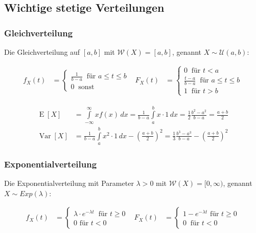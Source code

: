 \documentclass[25pt]{sciposter}
\newcommand{\W}{\mathcal{W}}
\newcommand{\U}{\mathcal{U}}
\newcommand{\Var}{\operatorname{Var}}
\newcommand{\E}{\operatorname{E}}
\begin{document}
\begin{multicols}{3}
\subsection*{Wichtige stetige Verteilungen}

\subsubsection*{Gleichverteilung}
Die Gleichverteilung auf $[a,b]$ mit $\W(X)=[a,b]$, genannt $X\sim\U(a,b)$:

\begin{align*}
	f_X(t) &= \begin{cases}
	\frac{1}{b-a} \ \text{ für } a \leq t \leq b\\
	0 \ \text{ sonst}
	\end{cases}
	& 
	F_X(t) &= \begin{cases}
	0 \ \text{ für } t<a \\
	\frac{t-a}{b-a} \ \text{ für } a \leq t \leq b\\
	1 \ \text{ für } t > b
	\end{cases}
\end{align*}


\begin{align*}
\E[X] &= {\displaystyle\int \limits _{-\infty }^{\infty }xf(x)\,dx={\frac {1}{b-a}}\int \limits _{a}^{b}x\cdot 1\,dx={\frac {1}{2}}{\frac {b^{2}-a^{2}}{b-a}}={\frac {a+b}{2}}} \\ \Var[X] &={\frac {1}{b-a}}\int \limits _{a}^{b}{x^{2}\cdot 1\,dx}-\left({\frac {a+b}{2}}\right)^{2}={\frac {1}{3}}{\frac {b^{3}-a^{3}}{b-a}}-\left({\frac {a+b}{2}}\right)^{2}
\end{align*}




\subsubsection*{Exponentialverteilung}
Die Exponentialverteilung mit Parameter $\lambda > 0$ mit $\W(X)=[0,\infty)$, genannt $X\sim Exp(\lambda)$:

\begin{align*}
f_X(t) &= \begin{cases}
\lambda \cdot e^{-\lambda t} \ \text{ für } t \geq 0\\
0 \text{ für } t < 0
\end{cases}
& 
F_X(t) &= \begin{cases}
1-e^{-\lambda t} \text{ für } t\geq 0\\
0 \ \text{ für } t < 0
\end{cases}
\end{align*}


\end{multicols}
\end{document}

